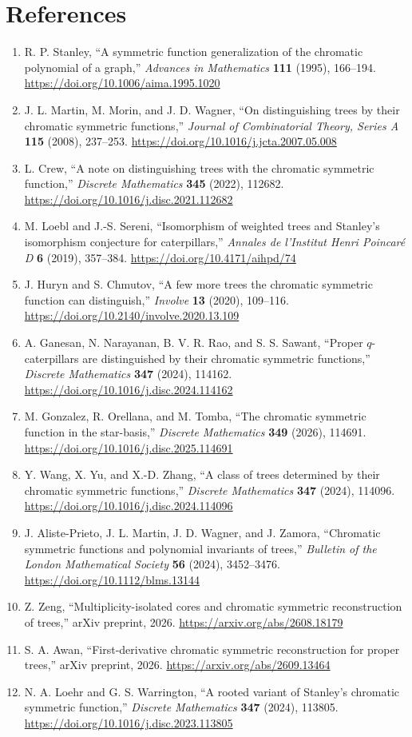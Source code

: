 \documentclass[11pt]{article}
\begin{document}
\section*{References}
\begin{enumerate}
\footnotesize

\item R. P. Stanley, ``A symmetric function generalization of the chromatic polynomial of a graph,'' \emph{Advances in Mathematics} \textbf{111} (1995), 166--194. \url{https://doi.org/10.1006/aima.1995.1020}
\item J. L. Martin, M. Morin, and J. D. Wagner, ``On distinguishing trees by their chromatic symmetric functions,'' \emph{Journal of Combinatorial Theory, Series A} \textbf{115} (2008), 237--253. \url{https://doi.org/10.1016/j.jcta.2007.05.008}
\item L. Crew, ``A note on distinguishing trees with the chromatic symmetric function,'' \emph{Discrete Mathematics} \textbf{345} (2022), 112682. \url{https://doi.org/10.1016/j.disc.2021.112682}
\item M. Loebl and J.-S. Sereni, ``Isomorphism of weighted trees and Stanley's isomorphism conjecture for caterpillars,'' \emph{Annales de l'Institut Henri Poincaré D} \textbf{6} (2019), 357--384. \url{https://doi.org/10.4171/aihpd/74}
\item J. Huryn and S. Chmutov, ``A few more trees the chromatic symmetric function can distinguish,'' \emph{Involve} \textbf{13} (2020), 109--116. \url{https://doi.org/10.2140/involve.2020.13.109}
\item A. Ganesan, N. Narayanan, B. V. R. Rao, and S. S. Sawant, ``Proper $q$-caterpillars are distinguished by their chromatic symmetric functions,'' \emph{Discrete Mathematics} \textbf{347} (2024), 114162. \url{https://doi.org/10.1016/j.disc.2024.114162}
\item M. Gonzalez, R. Orellana, and M. Tomba, ``The chromatic symmetric function in the star-basis,'' \emph{Discrete Mathematics} \textbf{349} (2026), 114691. \url{https://doi.org/10.1016/j.disc.2025.114691}
\item Y. Wang, X. Yu, and X.-D. Zhang, ``A class of trees determined by their chromatic symmetric functions,'' \emph{Discrete Mathematics} \textbf{347} (2024), 114096. \url{https://doi.org/10.1016/j.disc.2024.114096}
\item J. Aliste-Prieto, J. L. Martin, J. D. Wagner, and J. Zamora, ``Chromatic symmetric functions and polynomial invariants of trees,'' \emph{Bulletin of the London Mathematical Society} \textbf{56} (2024), 3452--3476. \url{https://doi.org/10.1112/blms.13144}
\item Z. Zeng, ``Multiplicity-isolated cores and chromatic symmetric reconstruction of trees,'' arXiv preprint, 2026. \url{https://arxiv.org/abs/2608.18179}
\item S. A. Awan, ``First-derivative chromatic symmetric reconstruction for proper trees,'' arXiv preprint, 2026. \url{https://arxiv.org/abs/2609.13464}
\item N. A. Loehr and G. S. Warrington, ``A rooted variant of Stanley's chromatic symmetric function,'' \emph{Discrete Mathematics} \textbf{347} (2024), 113805. \url{https://doi.org/10.1016/j.disc.2023.113805}


\end{enumerate}
\end{document}
